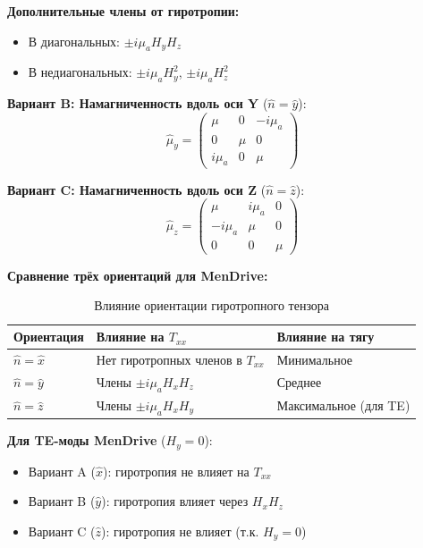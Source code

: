 \documentclass[a4paper,12pt]{article}
\begin{document}
\textbf{Дополнительные члены от гиротропии:}
\begin{itemize}
    \item В диагональных: $\pm i\mu_a H_y H_z$
    \item В недиагональных: $\pm i\mu_a H_y^2$, $\pm i\mu_a H_z^2$
\end{itemize}

\textbf{Вариант B: Намагниченность вдоль оси Y} ($\hat{n} = \hat{y}$):
\begin{equation}
\hat{\mu}_y = \begin{pmatrix}
\mu & 0 & -i\mu_a \\
0 & \mu & 0 \\
i\mu_a & 0 & \mu
\end{pmatrix}
\label{eq:gyrotropic_y}
\end{equation}

\textbf{Вариант C: Намагниченность вдоль оси Z} ($\hat{n} = \hat{z}$):
\begin{equation}
\hat{\mu}_z = \begin{pmatrix}
\mu & i\mu_a & 0 \\
-i\mu_a & \mu & 0 \\
0 & 0 & \mu
\end{pmatrix}
\label{eq:gyrotropic_z}
\end{equation}

\textbf{Сравнение трёх ориентаций для MenDrive:}

\begin{table}[h]
\centering
\caption{Влияние ориентации гиротропного тензора}
\label{tab:gyrotropic_comparison}
\begin{tabular}{@{}lll@{}}
\toprule
\textbf{Ориентация} & \textbf{Влияние на $T_{xx}$} & \textbf{Влияние на тягу} \\
\midrule
$\hat{n} = \hat{x}$ & Нет гиротропных членов в $T_{xx}$ & Минимальное \\
$\hat{n} = \hat{y}$ & Члены $\pm i\mu_a H_x H_z$ & Среднее \\
$\hat{n} = \hat{z}$ & Члены $\pm i\mu_a H_x H_y$ & Максимальное (для TE) \\
\bottomrule
\end{tabular}
\end{table}

\textbf{Для TE-моды MenDrive} ($H_y = 0$):
\begin{itemize}
    \item Вариант A ($\hat{x}$): гиротропия не влияет на $T_{xx}$
    \item Вариант B ($\hat{y}$): гиротропия влияет через $H_x H_z$
    \item Вариант C ($\hat{z}$): гиротропия не влияет (т.к. $H_y = 0$)
\end{itemize}
\end{document}

